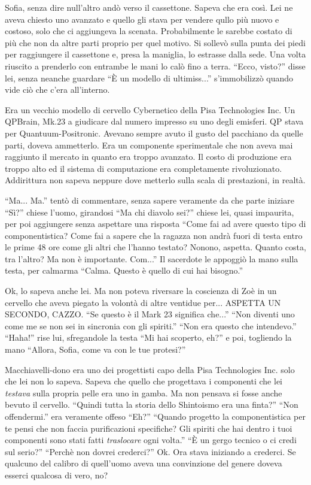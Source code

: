     Sofia, senza dire null'altro andò verso il cassettone. Sapeva che era così. Lei ne aveva chiesto uno avanzato e
    quello gli stava per vendere qullo più nuovo e costoso, solo che ci aggiungeva la scenata. Probabilmente le sarebbe
    costato di più che non da altre parti proprio per quel motivo. Si sollevò sulla punta dei piedi per raggiungere il
    cassettone e, presa la maniglia, lo estrasse dalla sede. Una volta riuscito a prenderlo con entrambe le mani lo calò
    fino a terra. ``Ecco, visto?'' disse lei, senza neanche guardare ``È  un modello di ultimiss...'' s'immobilizzò
    quando vide ciò che c'era all'interno.

    Era un vecchio modello di cervello Cybernetico della Pisa Technologies Inc. Un QPBrain, Mk.23 a giudicare dal numero
    impresso su uno degli emisferi. QP stava per
    Quantuum-Positronic. Avevano sempre avuto il gusto del pacchiano da quelle parti, doveva ammetterlo. Era un
    componente sperimentale che non aveva mai raggiunto il mercato in quanto era troppo avanzato. Il costo di produzione
    era troppo alto ed il sistema di computazione era completamente rivoluzionato. Addirittura non sapeva neppure dove
    metterlo sulla scala di prestazioni, in realtà.

    ``Ma... Ma.'' tentò di commentare, senza sapere veramente da che parte iniziare ``Sì?'' chiese l'uomo, girandosi
    ``Ma chi diavolo sei?'' chiese lei, quasi impaurita, per poi aggiungere senza aspettare una risposta ``Come fai ad
    avere questo tipo di componentistica? Come fai a sapere che la ragazza non andrà fuori di testa entro le prime 48
    ore come gli altri che l'hanno testato? Nonono, aspetta. Quanto costa, tra l'altro? Ma non è importante. Com...'' Il
    sacerdote le appoggiò la mano sulla testa, per calmarma ``Calma. Questo è quello di cui hai bisogno.''

    Ok, lo sapeva anche lei. Ma non poteva riversare la coscienza di Zoè in un cervello che aveva piegato la volontà di
    altre ventidue per... ASPETTA UN SECONDO, CAZZO. ``Se questo è il Mark 23 significa che...'' ``Non diventi uno come
    me se non sei in sincronia con gli spiriti.'' ``Non era questo che intendevo.'' ``Haha!'' rise lui, sfregandole la
    testa ``Mi hai scoperto, eh?'' e poi, togliendo la mano ``Allora, Sofia, come va con le tue protesi?''

    Macchiavelli-dono era uno dei progettisti capo della Pisa Technologies Inc. solo che lei non lo sapeva. Sapeva che
    quello che progettava i componenti che lei \emph{testava} sulla propria pelle era uno in gamba. Ma non pensava si
    fosse anche bevuto il cervello. ``Quindi tutta la storia dello Shintoismo era una finta?'' ``Non offendermi.'' era
    veramente offeso ``Eh?'' ``Quando progetto la componentistica per te pensi che non faccia purificazioni specifiche?
    Gli spiriti che hai dentro i tuoi componenti sono stati fatti \emph{traslocare} ogni volta.'' ``È un gergo tecnico o
    ci credi sul serio?'' ``Perchè non dovrei crederci?'' Ok. Ora stava iniziando a crederci. Se qualcuno del calibro di
    quell'uomo aveva una convinzione del genere doveva esserci qualcosa di vero, no?

